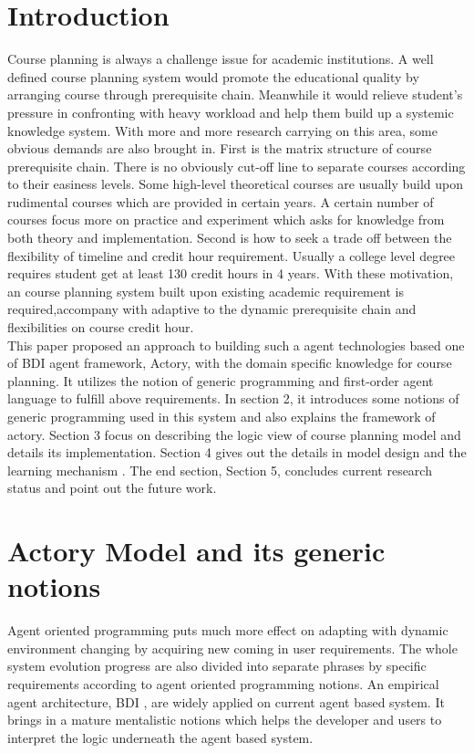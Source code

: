 \documentclass{sig-alternate}
\begin{document}
\section{Introduction}
Course planning is always a challenge issue for academic institutions.  A well defined course planning system would promote the educational quality by arranging course through prerequisite chain. Meanwhile it would relieve student's pressure in confronting with heavy workload and help them build up a systemic knowledge system.  With more and more research carrying on this area, some obvious demands are also brought in. First is the matrix structure of course prerequisite chain.  There is no obviously cut-off line to separate courses according to their easiness levels.  Some high-level theoretical courses are usually build upon rudimental courses which are provided in certain years. A certain number of courses focus more on practice and experiment which asks for  knowledge from both theory and implementation.  Second is how to seek a trade off between the flexibility of timeline and credit hour requirement.  Usually a college level degree requires student get at least 130 credit hours in 4 years.  With these motivation, an course planning system built upon existing academic requirement is required,accompany with adaptive to the dynamic prerequisite chain and flexibilities on course credit hour. \\

This paper proposed an approach to building such a agent technologies based one of BDI agent framework, Actory,  with the domain specific knowledge for course planning.   It utilizes the notion of generic programming and first-order agent language to fulfill above requirements. In section 2,  it introduces some notions of generic programming used in this system and also explains the framework of actory. Section 3 focus on describing the logic view of course planning model and details its implementation. Section 4 gives out the details in model design and the learning mechanism .  The end section, Section 5, concludes current research status and point out the future work. \\

\section{Actory Model and its generic notions}
Agent oriented programming puts much more effect on adapting with dynamic environment changing by acquiring new coming in user requirements\cite{bresciani04}.   The whole system evolution progress  are also divided into separate phrases by specific requirements  according to agent oriented programming notions.  An empirical agent architecture, BDI\cite{rao1991mra} , are widely applied on current agent based system.  It brings in a mature mentalistic notions which helps the developer and users to interpret the logic underneath the agent based system.\\
\end{document}
